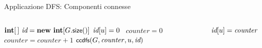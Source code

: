 \begin{frame}{Applicazione DFS: Componenti connesse}

\vspace{-12pt}
\begin{columns}[T]
\begin{Procedure}
\caption[A]{$\INTEGER[\,]$ \connectedcomponents(\Graph $G$)}
$\INTEGER[\,]\ \components = \NEW\ \INTEGER[G.\fontproc{size}()]$\;
{
  $\textit{id}[u] = 0$
}
\INTEGER\ $\mathit{counter} = 0$\;
{
  {
    $\mathit{counter} = \mathit{counter}+1$\;
    $\textsf{{\small ccdfs}}(G, \mathit{counter}, u, \textit{id})$\;
  }
}
\Return \components\;
\end{Procedure}
\begin{Procedure}
\caption[A]{\ccdfs(\Graph $G$, \INTEGER\ $\mathit{counter}$, \Node\ $u$, $\INTEGER[\,]\ \components$)}
$\textit{id}[u] = \mathit{counter}$\;
{
}
\end{Procedure}
\end{columns}
\end{frame}



